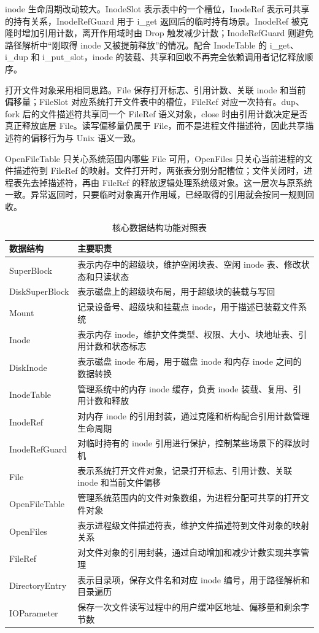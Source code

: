 inode 生命周期改动较大。InodeSlot 表示表中的一个槽位，InodeRef 表示可共享的持有关系，InodeRefGuard 用于 i\_get 返回后的临时持有场景。InodeRef 被克隆时增加引用计数，离开作用域时由 Drop 触发减少计数；InodeRefGuard 则避免路径解析中“刚取得 inode 又被提前释放”的情况。配合 InodeTable 的 i\_get、i\_dup 和 i\_put\_slot，inode 的装载、共享和回收不再完全依赖调用者记忆释放顺序。

打开文件对象采用相同思路。File 保存打开标志、引用计数、关联 inode 和当前偏移量；FileSlot 对应系统打开文件表中的槽位，FileRef 对应一次持有。dup、fork 后的文件描述符共享同一个 FileRef 语义对象，close 时由引用计数决定是否真正释放底层 File。读写偏移量仍属于 File，而不是进程文件描述符，因此共享描述符的偏移行为与 Unix 语义一致。

OpenFileTable 只关心系统范围内哪些 File 可用，OpenFiles 只关心当前进程的文件描述符到 FileRef 的映射。文件打开时，两张表分别分配槽位；文件关闭时，进程表先去掉描述符，再由 FileRef 的释放逻辑处理系统级对象。这一层次与原系统一致。异常返回时，只要临时对象离开作用域，已经取得的引用就会按同一规则回收。

\begin{table}[htbp]
  \centering
  \caption{核心数据结构功能对照表}\label{tab:fs-structures}
  \begin{tabular}{p{}p{}}
    \toprule
    \textbf{数据结构} & \textbf{主要职责} \\
    \midrule
    SuperBlock & 表示内存中的超级块，维护空闲块表、空闲 inode 表、修改状态和只读状态 \\
    DiskSuperBlock & 表示磁盘上的超级块布局，用于超级块的装载与写回 \\
    Mount & 记录设备号、超级块和挂载点 inode，用于描述已装载文件系统 \\
    Inode & 表示内存 inode，维护文件类型、权限、大小、块地址表、引用计数和状态标志 \\
    DiskInode & 表示磁盘 inode 布局，用于磁盘 inode 和内存 inode 之间的数据转换 \\
    InodeTable & 管理系统中的内存 inode 缓存，负责 inode 装载、复用、引用计数和释放 \\
    InodeRef & 对内存 inode 的引用封装，通过克隆和析构配合引用计数管理生命周期 \\
    InodeRefGuard & 对临时持有的 inode 引用进行保护，控制某些场景下的释放时机 \\
    File & 表示系统打开文件对象，记录打开标志、引用计数、关联 inode 和当前文件偏移 \\
    OpenFileTable & 管理系统范围内的文件对象数组，为进程分配可共享的打开文件对象 \\
    OpenFiles & 表示进程级文件描述符表，维护文件描述符到文件对象的映射关系 \\
    FileRef & 对文件对象的引用封装，通过自动增加和减少计数实现共享管理 \\
    DirectoryEntry & 表示目录项，保存文件名和对应 inode 编号，用于路径解析和目录遍历 \\
    IOParameter & 保存一次文件读写过程中的用户缓冲区地址、偏移量和剩余字节数 \\
    \bottomrule
  \end{tabular}
\end{table}

